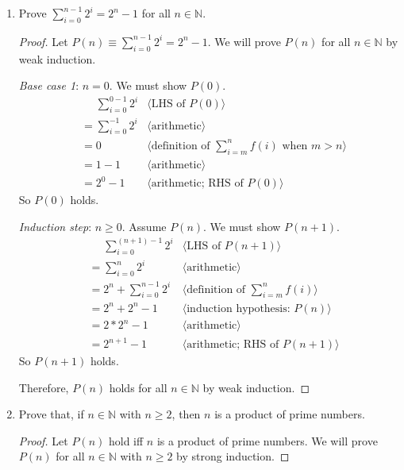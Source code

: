 \documentclass[11pt,fleqn]{article}
\newcommand{\pnote}[1]{{\langle \text{#1} \rangle}}
\begin{document}
\begin{enumerate}

  \item Prove $\sum^{n-1}_{i=0}2^i = 2^n - 1$ for all $n \in
    \mathbb{N}$.

\begin{proof}
Let $P(n) \equiv \sum^{n-1}_{i=0}2^i = 2^n - 1$.  We will prove $P(n)$
for all $n \in \mathbb{N}$ by weak induction.

\medskip

\emph{Base case 1}: $n = 0$.  We must show $P(0)$.
\begin{align*}
  &\phantom{{}=} \sum_{i=0}^{0-1} 2^{i} & \pnote{LHS of $P(0)$}\\
  &= \sum^{-1}_{i = 0} 2^i  & \pnote{arithmetic}\\
  &= 0          & \pnote{definition of $\textstyle{\sum}_{i=m}^{n} f(i)$ when $m > n$}\\
  &= 1 - 1      & \pnote{arithmetic}\\
  &= 2^0 - 1    & \pnote{arithmetic; RHS of $P(0)$}
\end{align*}
So $P(0)$ holds.

\medskip

\emph{Induction step}: $n \ge 0$. Assume $P(n)$. We must show $P(n + 1)$.
\begin{align*}
  &\phantom{{}=} \sum_{i=0}^{(n + 1) - 1} 2^i   & \pnote{LHS of $P(n + 1)$}\\
  &= \sum_{i=0}^{n} 2^{i}       & \pnote{arithmetic}\\
  &= 2^n + \sum_{i=0}^{n-1} 2^i & \pnote{definition of $\textstyle{\sum}_{i=m}^{n} f(i)$}\\
  &= 2^n + 2^n - 1             & \pnote{induction hypothesis: $P(n)$}\\
  &= 2*2^n - 1                 & \pnote{arithmetic}\\
  &= 2^{n+1} - 1               & \pnote{arithmetic; RHS of $P(n + 1)$}
\end{align*}
So $P(n + 1)$ holds.

\medskip

Therefore, $P(n)$ holds for all $n \in \mathbb{N}$ by weak induction.
\end{proof}

  \item Prove that, if $n \in \mathbb{N}$ with $n \ge 2$, then $n$ is
    a product of prime numbers.

\begin{proof}
Let $P(n)$ hold iff $n$ is a product of prime numbers.  We will prove
$P(n)$ for all $n \in \mathbb{N}$ with $n \ge 2$ by strong induction.


\end{proof}
\end{enumerate}
\end{document}
